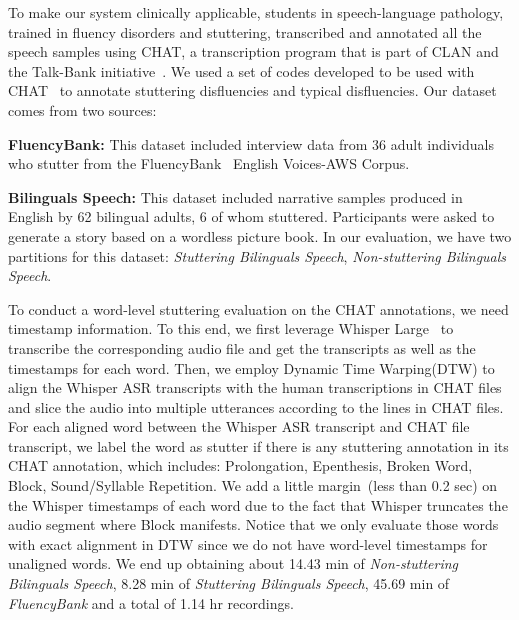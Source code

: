 To make our system clinically applicable, students in speech-language pathology, trained in fluency disorders and stuttering, transcribed and annotated all the speech samples using CHAT, a transcription program that is
part of CLAN and the Talk-Bank initiative~\cite{Macwhinney_2000}.
We used a set of codes developed to be used with
CHAT~\cite{Ratner_Brundage_2020}
to annotate stuttering disfluencies and typical disfluencies.
Our dataset comes from two sources:

\noindent\textbf{FluencyBank:} This dataset included interview data from 36 adult individuals who stutter from the 
FluencyBank~\cite{Ratner_2018}
English Voices-AWS Corpus. 

\noindent\textbf{Bilinguals Speech:} 
This dataset included narrative samples produced in English by 62 bilingual adults, 6 of whom stuttered. 
Participants were asked to generate a story based on a wordless picture book. 
In our evaluation, we have two partitions for this dataset: \textit{Stuttering Bilinguals Speech}, \textit{Non-stuttering Bilinguals Speech}.

To conduct a word-level stuttering evaluation on the CHAT annotations, we need timestamp information.
To this end, we first leverage Whisper Large~\cite{pmlr-v202-radford23a_whisper} to transcribe the corresponding audio file and get the transcripts as well as the timestamps for each word.
Then, we employ Dynamic Time Warping(DTW) to align the Whisper ASR transcripts with the human transcriptions in CHAT files and slice the audio into multiple utterances according to the lines in CHAT files.
For each aligned word between the Whisper ASR transcript and CHAT file transcript, we label the word as stutter if there is any stuttering annotation in its CHAT annotation, which includes: Prolongation, Epenthesis, Broken Word, Block, Sound/Syllable Repetition.
We add a little margin~(less than 0.2 sec) on the Whisper timestamps of each word due to the fact that Whisper truncates the audio segment where Block manifests. 
Notice that we only evaluate those words with exact alignment in DTW since we do not have word-level timestamps for unaligned words.
We end up obtaining about 14.43 min of \textit{Non-stuttering Bilinguals Speech}, 8.28 min of \textit{Stuttering Bilinguals Speech}, 45.69  min of \textit{FluencyBank} and a total of 1.14 hr recordings.
